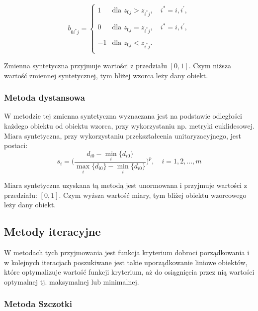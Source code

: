 \documentclass[12pt,a4paper]{report}
\begin{document}
\begin{equation}
b_{0i^{*}j}=\left\{ \begin{array}{lll}
1  & \textrm{dla  } z_{0j}>z_{i^{*}j}, \quad i^{*}=i,i^{'},\\\\
0 & \textrm{dla } z_{0j}=z_{i^{*}j},\quad i^{*}=i,i^{'},\\\\
-1 & \textrm{dla } z_{0j}<z_{i^{*}j}.\\
\end{array} \right.
\end{equation}

Zmienna syntetyczna przyjmuje wartości z przedziału $[0,1]$. Czym niższa wartość zmiennej syntetycznej, tym bliżej wzorca leży dany obiekt.

\subsubsection{Metoda dystansowa}
\noindent

W metodzie tej zmienna syntetyczna wyznaczana jest na podstawie odległości każdego obiektu od obiektu wzorca, przy wykorzystaniu np. metryki euklidesowej. Miara syntetyczna, przy wykorzystaniu przekształcenia unitaryzacyjnego, jest postaci: 
\newline
\begin{equation}
s_{i}=\bigg(\frac{d_{i0}-\min\limits_{i}\{d_{i0}\}}{\max\limits_{i}\{d_{i0}\}-\min\limits_{i}\{d_{i0}\}} \bigg)^{p}, \quad i=1,2,...,m
\end{equation}

Miara syntetyczna uzyskana tą metodą jest unormowana i przyjmuje wartości z przedziału: $[0,1]$. Czym wyższa wartość miary, tym bliżej obiektu wzorcowego leży dany obiekt. 

\subsection{Metody iteracyjne}
\noindent

W metodach tych przyjmowania jest funkcja kryterium dobroci porządkowania i w kolejnych iteracjach poszukiwane jest takie uporządkowanie liniowe obiektów, które optymalizuje wartość funkcji kryterium, aż do osiągnięcia przez nią wartości optymalnej tj. maksymalnej lub minimalnej. 


\subsubsection{Metoda Szczotki}
\noindent
\end{document}
